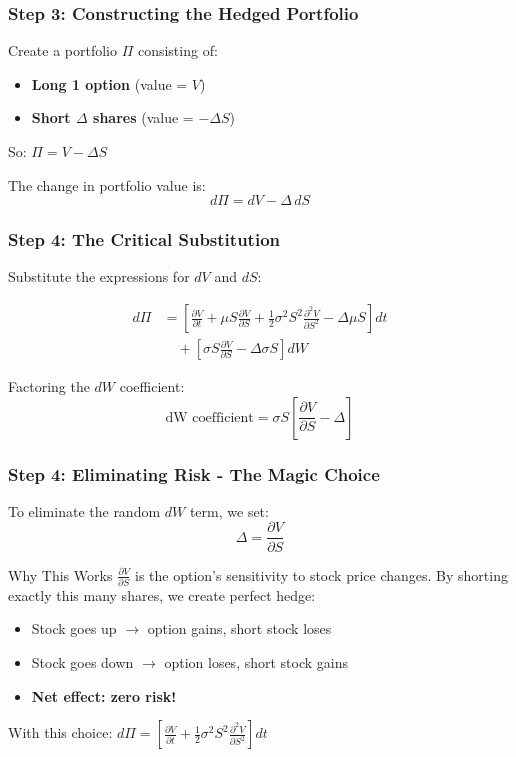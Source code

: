 \documentclass{beamer}
\begin{document}
\begin{frame}
\frametitle{Step 3: Constructing the Hedged Portfolio}
Create a portfolio $\Pi$ consisting of:
\begin{itemize}
\item \textbf{Long 1 option} (value = $V$)
\item \textbf{Short $\Delta$ shares} (value = $-\Delta S$)
\end{itemize}

So: $\Pi = V - \Delta S$

The change in portfolio value is:
$$d\Pi = dV - \Delta \, dS$$
\end{frame}

\begin{frame}
\frametitle{Step 4: The Critical Substitution}
Substitute the expressions for $dV$ and $dS$:

\begin{align}
d\Pi &= \left[\frac{\partial V}{\partial t} + \mu S \frac{\partial V}{\partial S} + \frac{1}{2}\sigma^2 S^2 \frac{\partial^2 V}{\partial S^2} - \Delta\mu S\right] dt \\
&\quad + \left[\sigma S \frac{\partial V}{\partial S} - \Delta\sigma S\right] dW
\end{align}

Factoring the $dW$ coefficient:
$$\text{dW coefficient} = \sigma S\left[\frac{\partial V}{\partial S} - \Delta\right]$$
\end{frame}

\begin{frame}
\frametitle{Step 4: Eliminating Risk - The Magic Choice}
To eliminate the random $dW$ term, we set:
$$\Delta = \frac{\partial V}{\partial S}$$

\begin{block}{Why This Works}
$\frac{\partial V}{\partial S}$ is the option's sensitivity to stock price changes. By shorting exactly this many shares, we create perfect hedge:
\begin{itemize}
\item Stock goes up $\rightarrow$ option gains, short stock loses
\item Stock goes down $\rightarrow$ option loses, short stock gains
\item \textbf{Net effect: zero risk!}
\end{itemize}
\end{block}

With this choice: $d\Pi = \left[\frac{\partial V}{\partial t} + \frac{1}{2}\sigma^2 S^2 \frac{\partial^2 V}{\partial S^2}\right] dt$
\end{frame}
\end{document}
